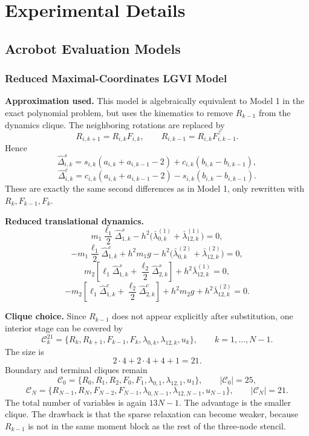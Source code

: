 \chapter{Experimental Details}
\label{appendix:experimental_details}

\section{Acrobot Evaluation Models}
\label{appendix:acrobot_evaluation_models}

\subsection{Reduced Maximal-Coordinates LGVI Model}
\label{appendix:reduced_maximal_coordinates_LGVI_model}

\textbf{Approximation used.} This model is algebraically equivalent to Model 1 in the exact polynomial problem, but uses the kinematics to remove \(R_{k-1}\) from the dynamics clique. The neighboring rotations are replaced by
\[
R_{i,k+1}=R_{i,k}F_{i,k},
\qquad
R_{i,k-1}=R_{i,k}F_{i,k-1}^{\top}.
\]
Hence
\[
\widehat\Delta^s_{i,k}
=s_{i,k}(a_{i,k}+a_{i,k-1}-2)+c_{i,k}(b_{i,k}-b_{i,k-1}),
\]
\[
\widehat\Delta^c_{i,k}
=c_{i,k}(a_{i,k}+a_{i,k-1}-2)-s_{i,k}(b_{i,k}-b_{i,k-1}).
\]
These are exactly the same second differences as in Model 1, only rewritten with \(R_k,F_{k-1},F_k\).

\textbf{Reduced translational dynamics.}
\[
m_1\frac{\ell_1}{2}\widehat\Delta^s_{1,k}
-h^2\Big(\bar\lambda^{(1)}_{0,k}+\bar\lambda^{(1)}_{12,k}\Big)=0,
\]
\[
-m_1\frac{\ell_1}{2}\widehat\Delta^c_{1,k}
+h^2m_1g
-h^2\Big(\bar\lambda^{(2)}_{0,k}+\bar\lambda^{(2)}_{12,k}\Big)=0,
\]
\[
m_2\left[\ell_1\widehat\Delta^s_{1,k}+\frac{\ell_2}{2}\widehat\Delta^s_{2,k}\right]
+h^2\bar\lambda^{(1)}_{12,k}=0,
\]
\[
-m_2\left[\ell_1\widehat\Delta^c_{1,k}+\frac{\ell_2}{2}\widehat\Delta^c_{2,k}\right]
+h^2m_2g+h^2\bar\lambda^{(2)}_{12,k}=0.
\]

\textbf{Clique choice.} Since \(R_{k-1}\) does not appear explicitly after substitution, one interior stage can be covered by
\[
\boxed{\mathcal C^{21}_k=
\{R_k,R_{k+1},F_{k-1},F_k,\lambda_{0,k},\lambda_{12,k},u_k\}},
\qquad k=1,\dots,N-1.
\]
The size is
\[
2\cdot4+2\cdot4+4+1=\boxed{21}.
\]
Boundary and terminal cliques remain
\[
\mathcal C_0=\{R_0,R_1, R_2, F_0, F_1, \lambda_{0,1},\lambda_{12,1},u_1\},\qquad |\mathcal C_0|=25,
\]
\[
\mathcal C_N=\{R_{N-1}, R_N, F_{N-2}, F_{N-1}, \lambda_{0,N-1},\lambda_{12,N-1},u_{N-1}\},\qquad |\mathcal C_N|=21.
\]
The total number of variables is again \(13N-1\). The advantage is the smaller clique. The drawback is that the sparse relaxation can become weaker,
because \(R_{k-1}\) is not in the same moment block as the rest of the three-node stencil.

